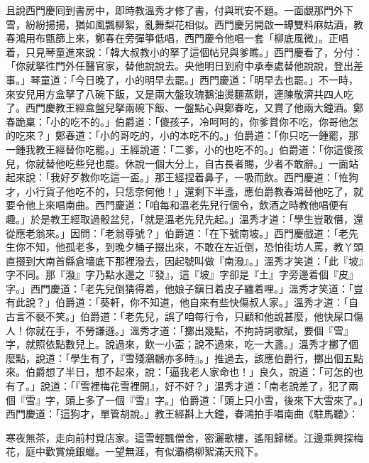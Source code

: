 且說西門慶囘到書房中，即時教溫秀才修了書，付與玳安不題。一面覷那門外下雪，紛紛揚揚，猶如風飄柳絮，亂舞梨花相似。西門慶另開啟一罈雙料麻姑酒，教春鴻用布甑篩上來，鄭春在旁彈箏低唱，西門慶令他唱一套「柳底風微」。正唱着，只見琴童進來說：「韓大叔教小的拏了這個帖兒與爹瞧。」西門慶看了，分付：「你就拏徃門外任醫官家，替他說說去。央他明日到府中承奉處替他說說，登出差事。」琴童道：「今日晚了，小的明早去罷。」西門慶道：「明早去也罷。」不一時，來安兒用方盒拏了八碗下飯，又是兩大盤玫瑰鵝油燙麵蒸餅，連陳敬濟共四人吃了。西門慶教王經盒盤兒拏兩碗下飯、一盤點心與鄭春吃，又賞了他兩大鐘酒。鄭春跪稟：「小的吃不的。」伯爵道：「傻孩子，冷呵呵的，你爹賞你不吃，你哥他怎的吃來？」鄭春道：「小的哥吃的，小的本吃不的。」伯爵道：「你只吃一鍾罷，那一鍾我教王經替你吃罷。」王經說道：「二爹，小的也吃不的。」伯爵道：「你這傻孩兒，你就替他吃些兒也罷。休說一個大分上，自古長者賜，少者不敢辭。」一面站起來說：「我好歹教你吃這一盃。」那王經捏着鼻子，一吸而飲。西門慶道：「恠狗才，小行貨子他吃不的，只恁奈何他！」還剩下半盞，應伯爵教春鴻替他吃了，就要令他上來唱南曲。西門慶道：「咱每和溫老先兒行個令，飲酒之時教他唱便有趣。」{}於是教王經取過骰盆兒，「就是溫老先兒先起。」溫秀才道：「學生豈敢僭，還從應老翁來。」因問：「老翁尊號？」伯爵道：「在下號南坡。」西門慶戲道：「老先生你不知，他孤老多，到晚夕桶子掇出來，不敢在左近倒，恐怕街坊人罵，教丫頭直掇到大南首縣倉墻底下那裡潑去，因起號叫做『南潑』。」溫秀才笑道：「此『坡』字不同。那『潑』字乃點水邊之『發』，這『坡』字卻是『土』字旁邊着個『皮』字。」{}西門慶道：「老先兒倒猜得着，他娘子鎭日着皮子纏着哩。」{}溫秀才笑道：「豈有此說？」伯爵道：「葵軒，你不知道，他自來有些快傷叔人家。」溫秀才道：「自古言不褻不笑。」伯爵道：「老先兒，誤了咱每行令，只顧和他說甚麼，他快屎口傷人！你就在手，不勞謙遜。」溫秀才道：「擲出幾點，不拘詩詞歌賦，要個『雪』字，就照依點數兒上。說過來，飲一小盃；說不過來，吃一大盞。」溫秀才擲了個麼點，說道：「學生有了，『雪殘鸂鶒亦多時』。」推過去，該應伯爵行，擲出個五點來。伯爵想了半日，想不起來，說：「逼我老人家命也！」良久，說道：「可怎的也有了。」說道：「『雪裡梅花雪裡開』，好不好？」溫秀才道：「南老說差了，犯了兩個『雪』字，頭上多了一個『雪』字。」伯爵道：「頭上只小雪，後來下大雪來了。」西門慶道：「這狗才，單管胡說。」教王經斟上大鐘，春鴻拍手唱南曲《駐馬聽》：

\begin{myquote}
寒夜無茶，走向前村覓店家。這雪輕飄僧舍，密灑歌樓，遙阻歸槎。江邊乘興探梅花，庭中歡賞燒銀蠟。一望無涯，有似灞橋柳絮滿天飛下。
\end{myquote}

